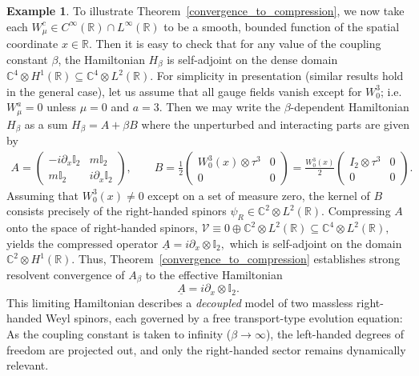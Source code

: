 \documentclass[reqno,12pt,letterpaper]{amsart}
\numberwithin{equation}{section}
\newcommand{\1}{\mathds{1}}
\theoremstyle{definition}
\newtheorem{Ex}[Th]{Example}
\begin{document}
\begin{Ex}
	\medskip
	
	To illustrate Theorem~\ref{convergence_to_compression}, we now take each $W^c_\mu \in C^\infty(\mathbb{R}) \cap L^\infty(\mathbb{R})$ to be a smooth, bounded function of the spatial coordinate \(x \in \mathbb{R}\). Then it is easy to check that for any value of the coupling constant \(\beta\), the Hamiltonian \(H_\beta\) is self-adjoint on the dense domain \(\mathbb{C}^4 \otimes H^1(\mathbb{R}) \subseteq \mathbb{C}^4 \otimes L^2(\mathbb{R})\).
For simplicity in presentation (similar results hold in the general case), let us assume that all gauge fields vanish except for \(W_0^3\); i.e. \(W_\mu^a = 0\) unless \(\mu = 0\) and \(a = 3\). Then we may write the \(\beta\)-dependent Hamiltonian \(H_\beta\) as a sum
$ 
	H_\beta = A + \beta B
$
	where the unperturbed and interacting parts are given by
	\begin{align}
		A = \begin{pmatrix}
			- i \partial_x  \mathbb{I}_2 & m \mathbb{I}_2 \\
			m \mathbb{I}_2 & i \partial_x  \mathbb{I}_2
		\end{pmatrix}, \qquad
		B = \frac{1}{2} \begin{pmatrix}
			W_0^3(x) \otimes \tau^3 & 0 \\
			0 & 0
		\end{pmatrix}
		= \frac{W_0^3(x)}{2} \begin{pmatrix}
			I_2 \otimes \tau^3 & 0 \\
			0 & 0
		\end{pmatrix}.
	\end{align}
	Assuming that \(W_0^3(x) \neq 0\) except on a set of measure zero, the kernel of \(B\) consists precisely of the right-handed spinors \(\psi_R \in \mathbb{C}^2 \otimes L^2(\mathbb{R})\). Compressing \(A\) onto the space of right-handed spinors,
$
	\mathscr{V} \equiv 0 \oplus \mathbb{C}^2 \otimes L^2(\mathbb{R}) \subseteq \mathbb{C}^4 \otimes L^2(\mathbb{R}),
$
	yields the compressed operator
$
	\underline{A} = i \partial_x \otimes \mathbb{I}_2,
$
	which is self-adjoint on the domain \(\mathbb{C}^2 \otimes H^1(\mathbb{R})\).
	Thus, 
	Theorem~\ref{convergence_to_compression} establishes strong resolvent convergence of \(A_\beta\) to the effective Hamiltonian
	\[
	\underline{A} = i \partial_x \otimes \mathbb{I}_2.
	\]
	This limiting Hamiltonian describes a \emph{decoupled} model of two massless right-handed Weyl spinors, each governed by a free transport-type evolution equation: As the coupling constant is taken to infinity (\(\beta \to \infty\)), the left-handed degrees of freedom are projected out, and only the right-handed sector remains dynamically relevant.
	

\end{Ex}
\end{document}
